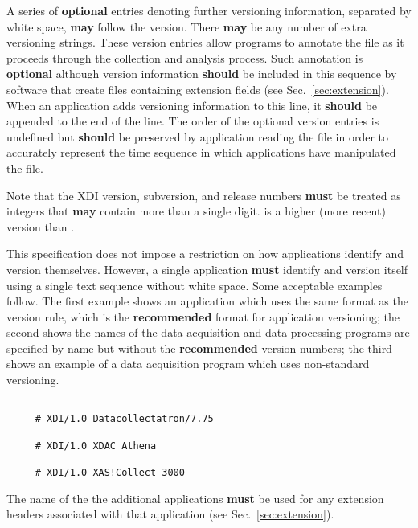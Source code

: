 \documentclass{article}
\begin{document}
A series of \textbf{optional} entries denoting further versioning
information, separated by white space, \textbf{may} follow the {\xdi}
version.  There \textbf{may} be any number of extra versioning
strings. These version entries allow programs to annotate the file as
it proceeds through the collection and analysis process.  Such
annotation is \textbf{optional} although version information
\textbf{should} be included in this sequence by software that create
{\xdi} files containing extension fields (see
Sec.~\ref{sec:extension}).  When an application adds versioning
information to this line, it \textbf{should} be appended to the end of
the line.  The order of the optional version entries is undefined but
\textbf{should} be preserved by application reading the file in order
to accurately represent the time sequence in which applications have
manipulated the file.

Note that the XDI version, subversion, and release numbers
\textbf{must} be treated as integers that \textbf{may} contain more
than a single digit.  is a higher (more recent) version than
.

This specification does not impose a restriction on how applications
identify and version themselves.  However, a single application
\textbf{must} identify and version itself using a single text sequence
without white space. Some acceptable examples follow.  The first
example shows an application which uses the same format as the {\xdi}
version rule, which is the \textbf{recommended} format for application
versioning; the second shows the names of the data acquisition and
data processing programs are specified by name but without the
\textbf{recommended} version numbers; the third shows an example of a
data acquisition program which uses non-standard versioning.


\begin{center}
\begin{Boxedminipage}[h]{0.7\linewidth}
\begin{verbatim}

     # XDI/1.0 Datacollectatron/7.75

     # XDI/1.0 XDAC Athena

     # XDI/1.0 XAS!Collect-3000

\end{verbatim}
\end{Boxedminipage}
\end{center}

The name of the the additional applications \textbf{must} be used for
any extension headers associated with that application (see
Sec.~\ref{sec:extension}).
\end{document}
